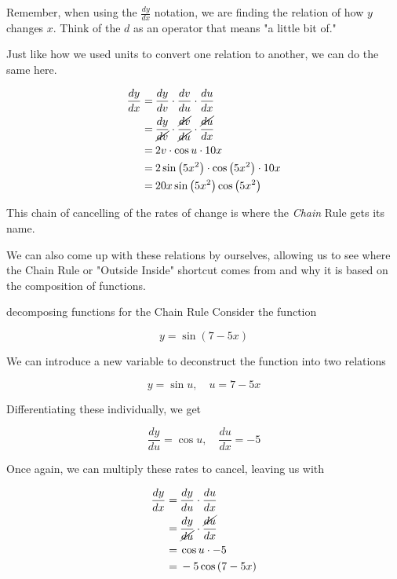 \begin{tip}
    Remember, when using the \( \frac{dy}{dx} \) notation, we are finding the relation of how \( y \) changes  \( x \). Think of the \( d \) as an operator that means "a little bit of."
\end{tip}

Just like how we used units to convert one relation to another, we can do the same here.

\begin{align}
    \dfrac{dy}{dx} = \> &\dfrac{dy}{dv} \cdot \dfrac{dv}{du} \cdot \dfrac{du}{dx} \\
    = \> &\dfrac{dy}{\cancel{dv}} \cdot \dfrac{\cancel{dv}}{\cancel{du}} \cdot \dfrac{\cancel{du}}{dx} \\
    = \> &2v \cdot \cos{u} \cdot 10x \\
    = \> &2 \sin{\left( 5x^2 \right)} \cdot \cos{\left( 5x^2 \right)} \cdot 10x \\
    = \> &20x \sin{\left( 5x^2 \right)}\cos{\left( 5x^2 \right)} \\
\end{align}

This chain of cancelling of the rates of change is where the \textit{Chain} Rule gets its name.

We can also come up with these relations by ourselves, allowing us to see where the Chain Rule or "Outside Inside" shortcut comes from and why it is based on the composition of functions.

\begin{example}{decomposing functions for the Chain Rule}
Consider the function

\[ y = \sin{\left( 7 - 5x \right)} \]

We can introduce a new variable to deconstruct the function into two relations

\[
    y = \sin{u}, \quad u = 7 - 5x
\]

Differentiating these individually, we get

\[
    \dfrac{dy}{du} = \cos{u}, \quad \dfrac{du}{dx} = -5
\]

Once again, we can multiply these rates to cancel, leaving us with

\begin{align}
    \dfrac{dy}{dx} = \> &\dfrac{dy}{du} \cdot \dfrac{du}{dx} \\
    = \> &\dfrac{dy}{\cancel{du}} \cdot \dfrac{\cancel{du}}{dx} \\
    = \> &\cos{u} \cdot -5 \\
    = \> &-5 \cos{\left( 7 - 5x \right)}
\end{align}

\end{example}

